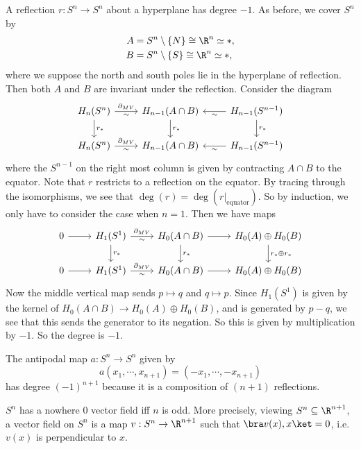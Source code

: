\documentclass[a4paper]{article}
\theoremstyle{definition}
\begin{document}
\begin{prop}
  A reflection $r: S^n \to S^n$ about a hyperplane has degree $-1$. As before, we cover $S^n$ by
  \begin{align*}
    A &= S^n \setminus \{N\} \cong \R^n \simeq *,\\
    B &= S^n \setminus \{S\} \cong \R^n \simeq *,
  \end{align*}
  where we suppose the north and south poles lie in the hyperplane of reflection. Then both $A$ and $B$ are invariant under the reflection. Consider the diagram
  \[
    \begin{tikzcd}
      H_n(S^n) \ar[r, "\partial_{MV}", "\sim"'] \ar[d, "r_*"] & H_{n - 1}(A \cap B) \ar[d, "r_*"] & H_{n - 1}(S^{n - 1}) \ar[l, "\sim"] \ar[d, "r_*"]\\
      H_n(S^n) \ar[r, "\partial_{MV}", "\sim"'] & H_{n - 1}(A \cap B) & H_{n - 1}(S^{n - 1}) \ar[l, "\sim"]
    \end{tikzcd}
  \]
  where the $S^{n - 1}$ on the right most column is given by contracting $A \cap B$ to the equator. Note that $r$ restricts to a reflection on the equator. By tracing through the isomorphisms, we see that $\deg(r) = \deg(r|_{\mathrm{equator}})$. So by induction, we only have to consider the case when $n = 1$. Then we have maps
  \[
    \begin{tikzcd}
      0 \ar[r] & H_1(S^1) \ar[r, "\partial_{MV}", "\sim"'] \ar[d, "r_*"] & H_0(A \cap B) \ar[d, "r_*"] \ar[r] & H_0(A) \oplus H_0(B) \ar[d, "r_* \oplus r_*"]\\
      0 \ar[r] & H_1(S^1) \ar[r, "\partial_{MV}", "\sim"'] & H_0(A \cap B) \ar[r] & H_0(A) \oplus H_0(B)
    \end{tikzcd}
  \]
  Now the middle vertical map sends $p \mapsto q$ and $q \mapsto p$. Since $H_1(S^1)$ is given by the kernel of $H_0(A \cap B) \to H_0(A) \oplus H_0(B)$, and is generated by $p - q$, we see that this sends the generator to its negation. So this is given by multiplication by $-1$. So the degree is $-1$.
\end{prop}

\begin{cor}
  The antipodal map $a: S^n \to S^n$ given by
  \[
    a(x_1, \cdots, x_{n + 1}) = (-x_1, \cdots, -x_{n + 1})
  \]
  has degree $(-1)^{n + 1}$ because it is a composition of $(n + 1)$ reflections.
\end{cor}

\begin{cor}
  $S^n$ has a nowhere $0$ vector field iff $n$ is odd. More precisely, viewing $S^n \subseteq \R^{n + 1}$, a vector field on $S^n$ is a map $v: S^n \to \R^{n + 1}$ such that $\bra v(x), x\ket = 0$, i.e.\ $v(x)$ is perpendicular to $x$.
\end{cor}
\end{document}
